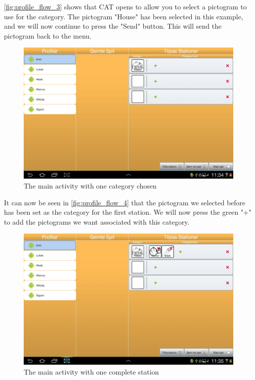 \autoref{fig:profile_flow_3} shows that CAT  opens to allow you to select a pictogram to use for the category.
The pictogram "House" has been selected in this example, and we will now continue to press the "Send" button. This will send the pictogram back to the menu.

\begin{figure}[H]
\centering
\includegraphics[width=0.9\linewidth]{img/screenshots/profile_flow_4.jpg}%
\caption{The main activity with one category chosen}
\label{fig:profile_flow_4}
\end{figure}

It can now be seen in \autoref{fig:profile_flow_4} that the pictogram we selected before has been set as the category for the first station. We will now press the green "+" to add the pictograms we want associated with this category.

\begin{figure}[H]
\centering
\includegraphics[width=0.9\linewidth]{img/screenshots/profile_flow_5.jpg}%
\caption{The main activity with one complete station}
\label{fig:profile_flow_5}
\end{figure}

